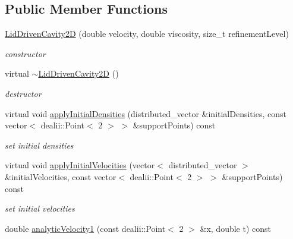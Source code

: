 \subsection*{Public Member Functions}
\begin{DoxyCompactItemize}
\item 
\hyperlink{classnatrium_1_1LidDrivenCavity2D_a139fe700f3e871e1b51eada1a41c69b1}{Lid\-Driven\-Cavity2\-D} (double velocity, double viscosity, size\-\_\-t refinement\-Level)
\begin{DoxyCompactList}\small\item\em constructor \end{DoxyCompactList}\item 
\hypertarget{classnatrium_1_1LidDrivenCavity2D_a8ae5029b008eb3d3c810bae81440b29c}{virtual \hyperlink{classnatrium_1_1LidDrivenCavity2D_a8ae5029b008eb3d3c810bae81440b29c}{$\sim$\-Lid\-Driven\-Cavity2\-D} ()}\label{classnatrium_1_1LidDrivenCavity2D_a8ae5029b008eb3d3c810bae81440b29c}

\begin{DoxyCompactList}\small\item\em destructor \end{DoxyCompactList}\item 
virtual void \hyperlink{classnatrium_1_1LidDrivenCavity2D_ab4a8629cfd3472847d40cf42a4ca72a8}{apply\-Initial\-Densities} (distributed\-\_\-vector \&initial\-Densities, const vector$<$ dealii\-::\-Point$<$ 2 $>$ $>$ \&support\-Points) const 
\begin{DoxyCompactList}\small\item\em set initial densities \end{DoxyCompactList}\item 
virtual void \hyperlink{classnatrium_1_1LidDrivenCavity2D_a6e633e30cfeae500757bdd4c37a5c478}{apply\-Initial\-Velocities} (vector$<$ distributed\-\_\-vector $>$ \&initial\-Velocities, const vector$<$ dealii\-::\-Point$<$ 2 $>$ $>$ \&support\-Points) const 
\begin{DoxyCompactList}\small\item\em set initial velocities \end{DoxyCompactList}\item 
\hypertarget{classnatrium_1_1LidDrivenCavity2D_a35bd8e7b30690dd85f4c6931f62aaa53}{double \hyperlink{classnatrium_1_1LidDrivenCavity2D_a35bd8e7b30690dd85f4c6931f62aaa53}{analytic\-Velocity1} (const dealii\-::\-Point$<$ 2 $>$ \&x, double t) const }\label{classnatrium_1_1LidDrivenCavity2D_a35bd8e7b30690dd85f4c6931f62aaa53}


\end{DoxyCompactItemize}
